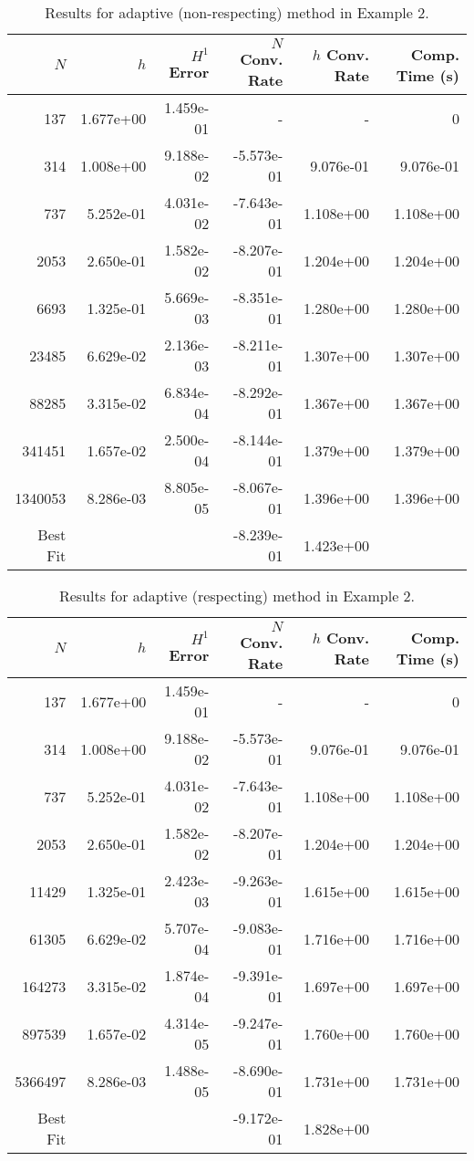 \documentclass{article}
\begin{document}
\begin{table}
\begin{tabular}{|r|r|r|r|r|r|}
\hline
$N$&$h$&$H^1$ Error&$N$ Conv. Rate &$h$ Conv. Rate&Comp. Time (s)\\ 
\hline
\hline
137&1.677e+00&1.459e-01&-&-&0\\ 
314&1.008e+00&9.188e-02&-5.573e-01&9.076e-01&9.076e-01\\ 
737&5.252e-01&4.031e-02&-7.643e-01&1.108e+00&1.108e+00\\ 
2053&2.650e-01&1.582e-02&-8.207e-01&1.204e+00&1.204e+00\\ 
6693&1.325e-01&5.669e-03&-8.351e-01&1.280e+00&1.280e+00\\ 
23485&6.629e-02&2.136e-03&-8.211e-01&1.307e+00&1.307e+00\\ 
88285&3.315e-02&6.834e-04&-8.292e-01&1.367e+00&1.367e+00\\ 
341451&1.657e-02&2.500e-04&-8.144e-01&1.379e+00&1.379e+00\\ 
1340053&8.286e-03&8.805e-05&-8.067e-01&1.396e+00&1.396e+00\\ 
\hline
Best Fit&&&-8.239e-01&1.423e+00&\\ 
\hline
\end{tabular}
\caption{Results for adaptive (non-respecting) method in Example 2.}
\label{tab:example2-adaptiveno43}
\end{table}

\begin{table}
\begin{tabular}{|r|r|r|r|r|r|}
\hline
$N$&$h$&$H^1$ Error&$N$ Conv. Rate &$h$ Conv. Rate&Comp. Time (s)\\ 
\hline
\hline
137&1.677e+00&1.459e-01&-&-&0\\ 
314&1.008e+00&9.188e-02&-5.573e-01&9.076e-01&9.076e-01\\ 
737&5.252e-01&4.031e-02&-7.643e-01&1.108e+00&1.108e+00\\ 
2053&2.650e-01&1.582e-02&-8.207e-01&1.204e+00&1.204e+00\\ 
11429&1.325e-01&2.423e-03&-9.263e-01&1.615e+00&1.615e+00\\ 
61305&6.629e-02&5.707e-04&-9.083e-01&1.716e+00&1.716e+00\\ 
164273&3.315e-02&1.874e-04&-9.391e-01&1.697e+00&1.697e+00\\ 
897539&1.657e-02&4.314e-05&-9.247e-01&1.760e+00&1.760e+00\\ 
5366497&8.286e-03&1.488e-05&-8.690e-01&1.731e+00&1.731e+00\\ 
\hline
Best Fit&&&-9.172e-01&1.828e+00&\\ 
\hline
\end{tabular}
\caption{Results for adaptive (respecting) method in Example 2.}
\label{tab:example2-adaptive}
\end{table}
\end{document}
